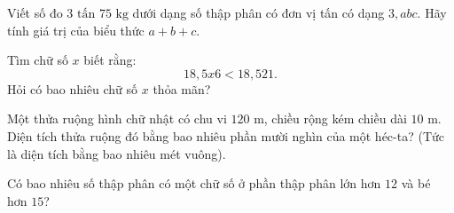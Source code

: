 \begin{ex} %
Viết số đo $3\text{ tấn } 75\text{ kg}$ dưới dạng số thập phân có đơn vị tấn có dạng $3{,}abc$. Hãy tính giá trị của biểu thức $a + b + c$.
\end{ex}

\begin{ex} %
Tìm chữ số $x$ biết rằng:
\[
18{,}5x6 < 18{,}521.
\]
Hỏi có bao nhiêu chữ số $x$ thỏa mãn?
\end{ex}

\begin{ex} %
Một thửa ruộng hình chữ nhật có chu vi $120\text{ m}$, chiều rộng kém chiều dài $10\text{ m}$. Diện tích thửa ruộng đó bằng bao nhiêu phần mười nghìn của một héc-ta? (Tức là diện tích bằng bao nhiêu mét vuông).
\end{ex}

\begin{ex} %
Có bao nhiêu số thập phân có một chữ số ở phần thập phân lớn hơn $12$ và bé hơn $15$?
\end{ex}
